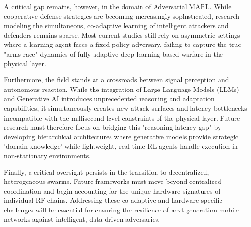 \documentclass[conference]{IEEEtran}
\newcommand{\adm}[1]{{\color{orange}{[#1]}}}
\newcommand{\rar}[1]{{\color{blue}{[#1]}}}
\begin{document}
A critical gap remains, however, in the domain of Adversarial MARL. 
While cooperative defense strategies are becoming increasingly sophisticated, research modeling the simultaneous, co-adaptive learning of intelligent attackers and defenders remains sparse. Most current studies still rely on asymmetric settings where a learning agent faces a fixed-policy adversary, failing to capture the true "arms race" dynamics of fully adaptive deep-learning-based warfare in the physical layer.

Furthermore, the field stands at a crossroads between signal perception and autonomous reaction. While the integration of Large Language Models (LLMs) and Generative AI introduces unprecedented reasoning and adaptation capabilities, it simultaneously creates new attack surfaces and latency bottlenecks incompatible with the millisecond-level constraints of the physical layer. 
Future research must therefore focus on bridging this "reasoning-latency gap" by developing hierarchical architectures where generative models provide strategic 'domain-knowledge' while lightweight, real-time RL agents handle execution in non-stationary environments.

Finally, a critical oversight persists in the transition to decentralized, heterogeneous swarms.
Future frameworks must move beyond centralized coordination and begin accounting for the unique hardware signatures of individual RF-chains. \adm{yes, but not only}
Addressing these co-adaptive and hardware-specific challenges will be essential for ensuring the resilience of next-generation mobile networks against intelligent, data-driven adversaries.


\ifCLASSOPTIONcaptionsoff
  \newpage
\fi

\end{document}

